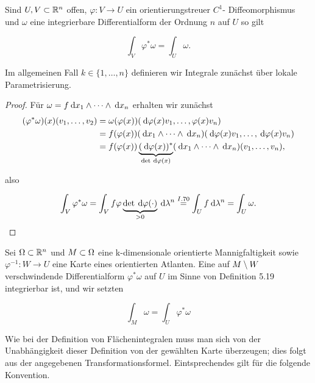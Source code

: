 \documentclass[skript.tex]{subfiles}
\begin{document}
	\begin{theorem}[Transformationsformel]
		Sind $U,V \subset {\mathbb{R}^n}$ offen, $\varphi \colon V \to U$ ein orientierungstreuer $C^1$- Diffeomorphismus und $\omega$ eine integrierbare Differentialform der Ordnung $n$ auf $U$ so gilt
		
		\begin{equation*}
		\int_V \varphi^* \omega = \int_U \omega.
		\end{equation*}
		
		Im allgemeinen Fall $k \in \{1, \dots, n\}$ definieren wir Integrale zunächst über lokale Parametrisierung.
		
		\begin{proof}
			Für $\omega = f \: \mathrm{d} x_1 \wedge \dots \wedge \: \mathrm{d} x_n$ erhalten wir zunächst 
			\begin{align*}
			(\varphi^* \omega)(x)(v_1, \dots, v_2) &= \omega(\varphi(x))(\: \mathrm{d} \varphi(x) v_1, \dots, \varphi(x)v_n) \\
			&= f(\varphi(x))(\: \mathrm{d} x_1 \wedge \dots \wedge \: \mathrm{d} x_n)(\: \mathrm{d} \varphi(x)v_1, \dots, \: \mathrm{d} \varphi(x) v_n)\\
			&= f(\varphi(x))\underbrace{(\: \mathrm{d} \varphi(x))^*}_{\det \: \mathrm{d} \varphi(x)}(\: \mathrm{d} x_1 \wedge \dots \wedge \: \mathrm{d} x_n)(v_1, \dots, v_n),
			\end{align*}
			
			also
			
			 \begin{equation*}
			 \int_V \varphi^* \omega = \int_V f \varphi \underbrace{\det \: \mathrm{d} \varphi( \cdot)}_{>0} \: \mathrm{d} \lambda^n \overset{I.70}{=} \int_U f \: \mathrm{d} \lambda^n = \int_U \omega.
			 \end{equation*}
			
			
		\end{proof}
	\end{theorem}
	
		\begin{defin}
			Sei $\Omega \subset {\mathbb{R}^n}$ und $M \subset \Omega$ eine k-dimensionale orientierte Mannigfaltigkeit sowie $\varphi^{-1} \colon W \to U$ eine Karte eines orientierten Atlanten. Eine auf $ M\setminus W$ verschwindende Differentialform $\varphi^* \omega$ auf $U$ im Sinne von Definition 5.19 integrierbar ist, und wir setzten
		
			\begin{equation*}
			\int_M \omega = \int_U \varphi^* \omega
			\end{equation*}
			
			Wie bei der Definition von Flächenintegralen muss man sich von der Unabhängigkeit dieser Definition von der gewählten Karte überzeugen; dies folgt aus der angegebenen Transformationsformel. Eintsprechendes gilt für die folgende Konvention.
		\end{defin}
	
\end{document}
